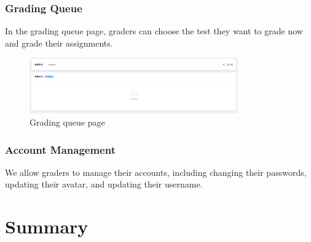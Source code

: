 \documentclass[12pt]{article}
\begin{document}
\subsubsection{Grading Queue}
In the grading queue page, graders can choose the test they want to grade now and grade their assignments.
\begin{figure}[H]
    \centering
    \includegraphics[width=0.8\textwidth]{grader/queue.png}
    \caption{Grading queue page}
    \label{fig:GradingQueue page}
\end{figure}
\subsubsection{Account Management}
We allow graders to manage their accounts, including changing their passwords, updating their avatar, and updating their username.

\section{Summary}
\end{document}
